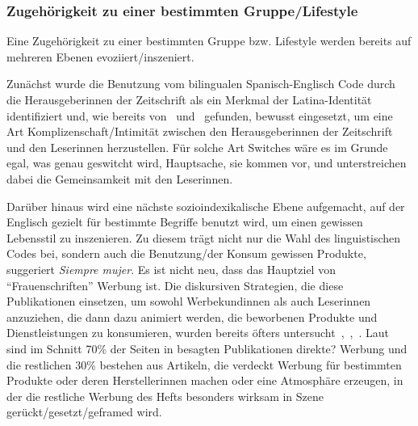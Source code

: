 \subsubsection{Zugehörigkeit zu einer bestimmten Gruppe/Lifestyle}
Eine Zugehörigkeit zu einer bestimmten Gruppe bzw. Lifestyle werden bereits auf mehreren Ebenen evoziiert/inszeniert.

Zunächst wurde die Benutzung vom bilingualen Spanisch-Englisch Code durch die Herausgeberinnen der Zeitschrift als ein Merkmal der Latina-Identität identifiziert und, wie bereits von~\cite{Ticknor12} und~\cite{Mahootian05} gefunden, bewusst eingesetzt, um eine Art Komplizenschaft/Intimität zwischen den Herausgeberinnen der Zeitschrift und den Leserinnen herzustellen.
Für solche Art Switches wäre es im Grunde egal, was genau geswitcht wird, Hauptsache, sie kommen vor, und unterstreichen dabei die Gemeinsamkeit mit den Leserinnen.

Darüber hinaus wird eine nächste sozioindexikalische Ebene aufgemacht, auf der Englisch gezielt für bestimmte Begriffe benutzt wird, um einen gewissen Lebensstil zu inszenieren.
Zu diesem trägt nicht nur die Wahl des linguistischen Codes bei, sondern auch die Benutzung/der Konsum gewissen Produkte, suggeriert \textit{Siempre mujer}.
Es ist nicht neu, dass das Hauptziel von ``Frauenschriften'' Werbung ist.
Die diskursiven Strategien, die diese Publikationen einsetzen, um sowohl Werbekundinnen als auch Leserinnen anzuziehen, die dann dazu animiert werden, die beworbenen Produkte und Dienstleistungen zu konsumieren, wurden bereits öfters untersucht~\cite{McCracken93},~\cite{Talbot95},~\cite{Beer2002}.
Laut~\cite{McCracken93} sind im Schnitt 70\% der Seiten in besagten Publikationen direkte? Werbung und die restlichen 30\% bestehen aus Artikeln, die verdeckt Werbung für bestimmten Produkte oder deren Herstellerinnen machen oder eine Atmosphäre erzeugen, in der die restliche Werbung des Hefts besonders wirksam in Szene gerückt/gesetzt/geframed wird.

